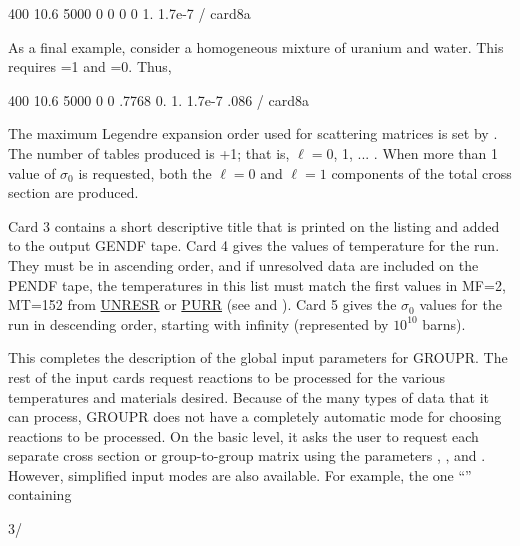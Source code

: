 \small
\begin{ccode}

   400 10.6 5000 0 0 0 0 1. 1.7e-7 / card8a

\end{ccode}
\normalsize

\noindent
As a final example, consider a homogeneous mixture of uranium and water.
This requires =1 and =0.  Thus,

\small
\begin{ccode}

   400 10.6 5000 0 0 .7768 0. 1. 1.7e-7 .086 / card8a

\end{ccode}
\normalsize

The maximum Legendre expansion order used for scattering matrices is set
by .  The number of tables produced is +1; that is,
$\ell=0$, 1, ... .  When more than 1 value of $\sigma_0$
is requested, both the $\ell{=}0$ and $\ell{=}1$ components of the
total cross section are produced.

Card 3 contains a short descriptive title that is printed on the listing
and added to the output GENDF tape.  Card 4 gives the  values
of temperature for the run.  They must be in ascending order, and if
unresolved data are included on the PENDF tape, the temperatures in this
list must match the first  values in MF=2, MT=152 from
\hyperlink{sUNRESRhy}{UNRESR} or
\hyperlink{sPURRhy}{PURR} (see
 and
).  Card 5 gives the
$\sigma_0$ values for the run in descending order, starting with
infinity (represented by $10^{10}$ barns).

This completes the description of the global input parameters for GROUPR.
The rest of the input cards request reactions to be processed for the
various temperatures and materials desired.  Because of the many types
of data that it can process, GROUPR does not have a completely
automatic mode for choosing reactions to be processed.  On the basic
level, it asks the user to request each separate cross section or
group-to-group matrix using the parameters , ,
and .  However, simplified input modes are also available.
For example, the one ``'' containing

\small
\begin{ccode}

    3/

\end{ccode}
\normalsize

